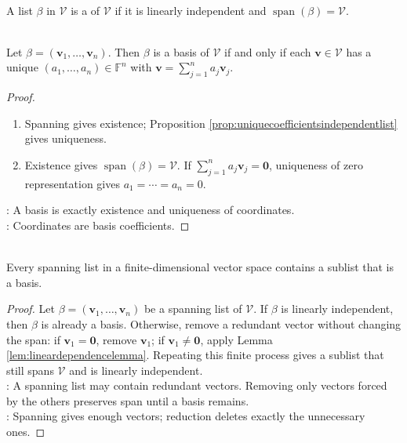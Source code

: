 \begin{definition} \\
A list $\beta$ in $\mathcal{V}$ is a  of $\mathcal{V}$ if it is linearly independent and $\operatorname{span}(\beta)=\mathcal{V}$.
\end{definition}

\begin{proposition} \label{prop:basis-unique-coordinate-representation} \\
Let $\beta=(\mathbf{v}_1,\ldots,\mathbf{v}_n)$. Then $\beta$ is a basis of $\mathcal{V}$ if and only if each $\mathbf{v}\in\mathcal{V}$ has a unique $(a_1,\ldots,a_n)\in\mathbb{F}^n$ with $\mathbf{v}=\sum\limits_{j=1}^n a_j\mathbf{v}_j$.
\begin{proof}
\begin{enumerate}[label=\roman*.]
\setlength{\itemsep}{0pt}
\item[$(\Rightarrow)$] Spanning gives existence; Proposition \ref{prop:uniquecoefficientsindependentlist} gives uniqueness.
\item[$(\Leftarrow)$] Existence gives $\operatorname{span}(\beta)=\mathcal{V}$. If $\sum\limits_{j=1}^n a_j\mathbf{v}_j=\mathbf{0}$, uniqueness of zero representation gives $a_1=\cdots=a_n=0$.
\end{enumerate}
: A basis is exactly existence and uniqueness of coordinates.\\
: Coordinates are basis coefficients.
\end{proof}
\end{proposition}

\begin{theorem} \label{thm:reducing-spanning-lists} \\
Every spanning list in a finite-dimensional vector space contains a sublist that is a basis.
\begin{proof}
Let $\beta=(\mathbf{v}_1,\ldots,\mathbf{v}_n)$ be a spanning list of $\mathcal{V}$. If $\beta$ is linearly independent, then $\beta$ is already a basis. Otherwise, remove a redundant vector without changing the span: if $\mathbf{v}_1=\mathbf{0}$, remove $\mathbf{v}_1$; if $\mathbf{v}_1\neq\mathbf{0}$, apply Lemma \ref{lem:lineardependencelemma}. Repeating this finite process gives a sublist that still spans $\mathcal{V}$ and is linearly independent.\\
: A spanning list may contain redundant vectors. Removing only vectors forced by the others preserves span until a basis remains.\\
: Spanning gives enough vectors; reduction deletes exactly the unnecessary ones.
\end{proof}
\end{theorem}

